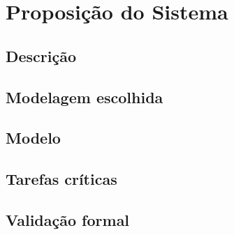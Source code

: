 \chapter{\label{chap:chap3}Proposição do Sistema}
\section{\label{sec:secao1}Descrição}
\section{\label{sec:secao2}Modelagem escolhida}
\section{\label{sec:secao3}Modelo}
\section{\label{sec:secao4}Tarefas críticas}
\section{\label{sec:secao5}Validação formal}
